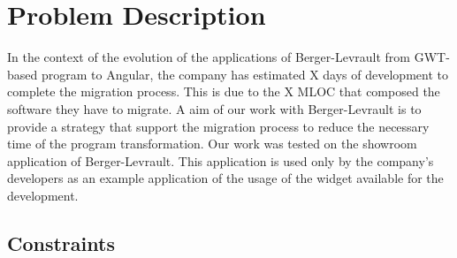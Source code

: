 \documentclass[conference]{IEEEtran}
\begin{document}
    \section{Problem Description}
    \label{sec:problem}
    
    
    In the context of the evolution of the applications of Berger-Levrault
        from GWT-based program to Angular, the company has estimated X days of development to complete the migration process.
    This is due to the X MLOC that composed the software they have to migrate.
    A aim of our work with Berger-Levrault is to provide a strategy that support
        the migration process to reduce the necessary time of the program transformation.
    Our work was tested on the showroom application of Berger-Levrault. 
    This application is used only by the company's developers as
        an example application of the usage of the widget available for the development.
    
    
    
    \subsection{Constraints}
    \label{sec:constraints}
\end{document}

